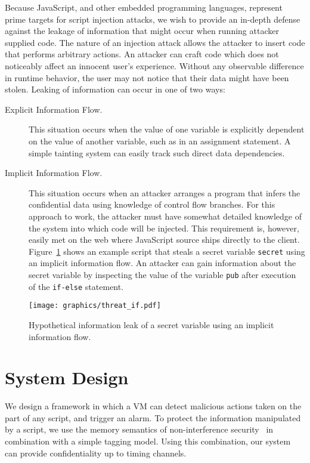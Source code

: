 \documentclass[preprint]{sigplanconf}
\begin{document}
Because JavaScript, and other embedded programming languages, represent prime targets for script injection attacks, we wish to provide an in-depth defense against the leakage of information that might occur when running attacker supplied code.
The nature of an injection attack allows the attacker to insert code that performs arbitrary actions.
An attacker can craft code which does not noticeably affect an innocent user's experience.
Without any observable difference in runtime behavior, the user may not notice that their data might have been stolen.
Leaking of information can occur in one of two ways:
\begin{description}
 \item[Explicit Information Flow.]
 This situation occurs when the value of one variable is explicitly dependent on the value of another variable, such as in an assignment statement. A simple tainting system can easily track such direct data dependencies.

 \item[Implicit Information Flow.]
 This situation occurs when an attacker arranges a program that infers the confidential data using knowledge of control flow branches.
 For this approach to work, the attacker must have somewhat detailed knowledge of the system into which code will be injected.
 This requirement is, however, easily met on the web where JavaScript source ships directly to the client.
 Figure~\ref{fig:threat_if} shows an example script that steals a secret variable \texttt{secret} using an implicit information flow.
 An attacker can gain information about the secret variable by inspecting the value of the variable \texttt{pub} after execution of the \texttt{if-else} statement.
\end{description}

\begin{figure}[ht]
  \centerline{\texttt{[image: graphics/threat\_if.pdf]}}
  \caption{Hypothetical information leak of a secret variable using an implicit information flow.}
  \label{fig:threat_if}
\end{figure}



\section{System Design}
\label{sec:system-design}

We design a framework in which a VM can detect malicious actions taken on the part of any script, and trigger an alarm.
To protect the information manipulated by a script, we use the memory semantics of non-interference security~\cite{goguen1982security} in combination with a simple tagging model.
Using this combination, our system can provide confidentiality up to timing channels.
\end{document}
